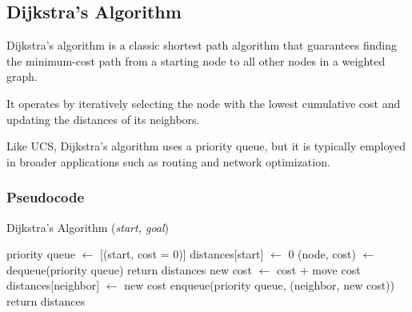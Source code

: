 \subsection{Dijkstra's Algorithm}
\begin{flushleft}
	Dijkstra's algorithm is a classic shortest path algorithm that guarantees finding the minimum-cost path from a starting node to all other nodes in a weighted graph.

	It operates by iteratively selecting the node with the lowest cumulative cost and updating the distances of its neighbors.

	Like UCS, Dijkstra's algorithm uses a priority queue, but it is typically employed in broader applications such as routing and network optimization.
\end{flushleft}

\subsubsection{Pseudocode}
\begin{algorithm}[H]
	\caption{Dijkstra's Algorithm (\textit{start, goal})}
	\label{alg:dijkstra}
	\begin{algorithmic}[1]
		\State priority queue \(\gets\) [(start, cost = 0)]
		\State distances[start] \(\gets\) 0
		\State (node, cost) \(\gets\) dequeue(priority queue)
		\State return distances
		\EndIf
		\State new cost \(\gets\) cost + move cost
		\State distances[neighbor] \(\gets\) new cost
		\State enqueue(priority queue, (neighbor, new cost))
		\EndIf
		\EndFor
		\EndWhile
		\State return distances
	\end{algorithmic}
\end{algorithm}


